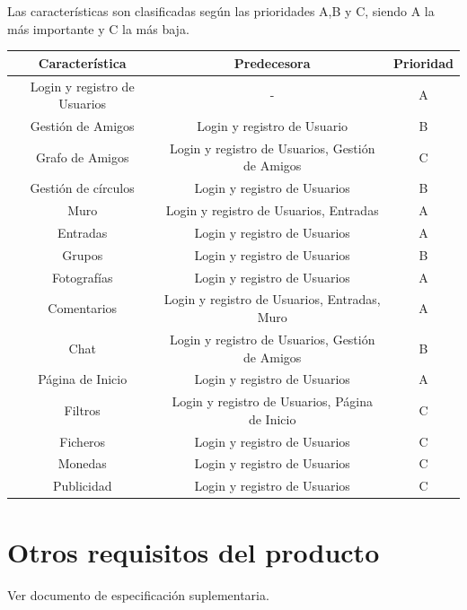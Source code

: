 \documentclass[12pt, a4paper, titlepage]{article}
\begin{document}
Las características son clasificadas según las prioridades A,B y C, siendo A la más importante y C la más baja.

\begin{center}

\begin{tabular}{|c|c|c|}
\hline 
\textbf{Característica} & \textbf{Predecesora} & \textbf{Prioridad} \\ 
\hline 
Login y registro de Usuarios & - & A \\ 
\hline 
Gestión de Amigos & Login y registro de Usuario & B \\ 
\hline 
Grafo de Amigos & Login y registro de Usuarios, Gestión de Amigos & C \\ 
\hline 
Gestión de círculos & Login y registro de Usuarios & B\\ 
\hline 
Muro & Login y registro de Usuarios, Entradas & A \\ 
\hline 
Entradas & Login y registro de Usuarios & A \\ 
\hline 
Grupos & Login y registro de Usuarios & B \\ 
\hline 
Fotografías & Login y registro de Usuarios & A \\ 
\hline 
Comentarios & Login y registro de Usuarios, Entradas, Muro & A \\ 
\hline 
Chat & Login y registro de Usuarios, Gestión de Amigos & B \\ 
\hline 
Página de Inicio & Login y registro de Usuarios & A \\ 
\hline 
Filtros & Login y registro de Usuarios, Página de Inicio & C \\ 
\hline 
Ficheros & Login y registro de Usuarios & C \\ 
\hline 
Monedas & Login y registro de Usuarios & C \\ 
\hline 
Publicidad & Login y registro de Usuarios & C \\ 
\hline 
\end{tabular} 

\end{center}

\section{Otros requisitos del producto}

Ver documento de especificación suplementaria.
\end{document}

